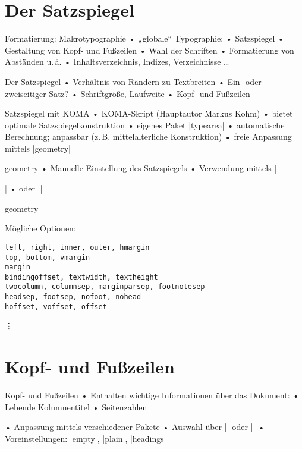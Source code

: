 


\section{Der Satzspiegel}
\begin{frame}{Formatierung: Makrotypographie}
• „globale“ Typographie:
• Satzspiegel
• Gestaltung von Kopf- und Fußzeilen 
• Wahl der Schriften
• Formatierung von Abständen u.\,ä.
• Inhaltsverzeichnis, Indizes, Verzeichnisse …
\• 
\end{frame}


\begin{frame}{Der Satzspiegel}
• Verhältnis von Rändern zu Textbreiten
• Ein- oder zweiseitiger Satz?
• Schriftgröße, Laufweite
• Kopf- und Fußzeilen
\•
\end{frame}

\begin{frame}{Satzspiegel mit KOMA}
• KOMA-Skript (Hauptautor Markus Kohm)
• bietet optimale Satzspiegelkonstruktion
• eigenes Paket |typearea|
• automatische Berechnung; anpassbar (z.\,B. mittelalterliche Konstruktion)
• freie Anpassung mittels |geometry|
\• 
\end{frame}

\begin{frame}[fragile]{geometry}
• Manuelle Einstellung des Satzspiegels
• Verwendung mittels |\usepackage[top=2cm,bottom=5cm]{geometry}|
• oder |\geometry{top=2cm,bottom=5cm}|
\•
\end{frame}

\begin{frame}[fragile]{geometry}
\begin{block}{Mögliche Optionen:}
\begin{verbatim}
left, right, inner, outer, hmargin
top, bottom, vmargin
margin
bindingoffset, textwidth, textheight
twocolumn, columnsep, marginparsep, footnotesep
headsep, footsep, nofoot, nohead
hoffset, voffset, offset
\end{verbatim}
\vdots
\end{block}
\end{frame}

\section{Kopf- und Fußzeilen}
\begin{frame}[fragile]{Kopf- und Fußzeilen}
• Enthalten wichtige Informationen über das Dokument:
• Lebende Kolumnentitel
• Seitenzahlen
\•

• Anpassung mittels verschiedener Pakete
• Auswahl über |\pagestyle{Seitenstil}| oder |\thispagestyle{Seitenstil}|
• Voreinstellungen: |empty|, |plain|, |headings|
\•
\end{frame}

